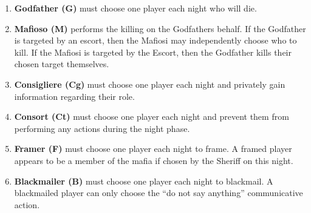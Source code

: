 \begin{enumerate}
	\item\textbf{Godfather (G)} must choose one player each night who will die.
	\item\textbf{Mafioso (M)} performs the killing on the Godfathers behalf. If
	      the
	      Godfather is targeted by an escort, then the Mafiosi may independently
	      choose who to kill. If the Mafiosi is targeted by the Escort, then the
	      Godfather kills their chosen target themselves.
	\item\textbf{Consigliere (Cg)} must choose one player each night and
	      privately
	      gain information regarding their role.
	\item\textbf{Consort (Ct)} must choose one player each night and prevent
	      them
	      from performing any actions during the night phase.
	\item\textbf{Framer (F)} must choose one player each night to frame. A
	      framed
	      player appears to be a member of the mafia if chosen by the Sheriff on this
	      night.
	\item\textbf{Blackmailer (B)} must choose one player each night to
	      blackmail. A
	      blackmailed player can only choose the “do not say anything” communicative
	      action.
\end{enumerate}